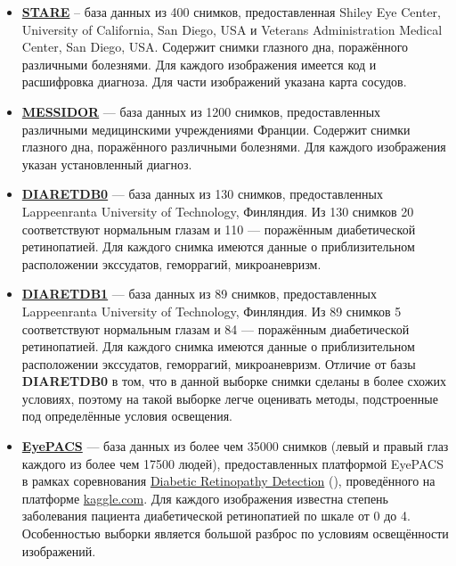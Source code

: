 \documentclass[12pt,fleqn]{article}
\begin{document}
\begin{itemize}
	\item \textbf{\href{http://www.ces.clemson.edu/~ahoover/stare/}{STARE}} -- база данных из 400 снимков, предоставленная Shiley Eye Center, University of California, San Diego, USA и Veterans Administration Medical Center, San Diego, USA. Содержит снимки глазного дна, поражённого различными болезнями. Для каждого изображения имеется код и расшифровка диагноза. Для части изображений указана карта сосудов.
	\item \textbf{\href{http://www.adcis.net/en/Download-Third-Party/Messidor.html}{MESSIDOR}} --- база данных из 1200 снимков, предоставленных различными медицинскими учреждениями Франции. Содержит снимки глазного дна, поражённого различными болезнями. Для каждого изображения указан установленный диагноз.
	\item \textbf{\href{http://www.it.lut.fi/project/imageret/diaretdb0}{DIARETDB0}} --- база данных из 130 снимков, предоставленных Lappeenranta University of Technology, Финляндия. Из 130 снимков 20 соответствуют нормальным глазам и 110 --- поражённым диабетической ретинопатией. Для каждого снимка имеются данные о приблизительном расположении экссудатов, геморрагий, микроаневризм. 
	\item \textbf{\href{http://www.it.lut.fi/project/imageret/diaretdb1/}{DIARETDB1}}  --- база данных из 89 снимков, предоставленных Lappeenranta University of Technology, Финляндия. Из 89 снимков 5 соответствуют нормальным глазам и 84 --- поражённым диабетической ретинопатией. Для каждого снимка имеются данные о приблизительном расположении экссудатов, геморрагий, микроаневризм. Отличие от базы \textbf{DIARETDB0} в том, что в данной выборке снимки сделаны в более схожих условиях, поэтому на такой выборке легче оценивать методы, подстроенные под определённые условия освещения.
	\item \textbf{\href{https://www.kaggle.com/c/diabetic-retinopathy-detection/data}{EyePACS}} --- база данных из более чем 35000 снимков (левый и правый глаз каждого из более чем 17500 людей), предоставленных платформой EyePACS в рамках соревнования \href{https://www.kaggle.com/c/diabetic-retinopathy-detection/}{Diabetic Retinopathy Detection} (\cite{kaggle}), проведённого на платформе \url{kaggle.com}. Для каждого изображения известна степень заболевания пациента диабетической ретинопатией по шкале от 0 до 4. Особенностью выборки является большой разброс по условиям освещённости изображений.
\end{itemize}
\end{document}
